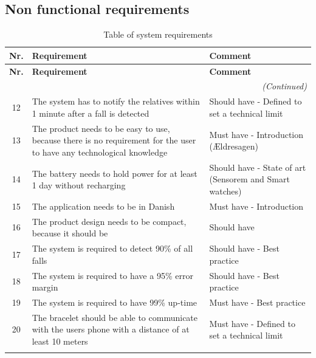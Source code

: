 \subsection{Non functional requirements}

\renewcommand{\arraystretch}{1.3}

\begin{longtable}{|c|p{8cm}|p{4cm}|}
\hline
\textbf{Nr.} & \textbf{Requirement} & \textbf{Comment} \\
\hline
\endfirsthead

\hline
\textbf{Nr.} & \textbf{Requirement} & \textbf{Comment} \\
\hline
\endhead

\hline
\multicolumn{3}{r}{\textit{(Continued)}} \\
\hline
\endfoot

\hline
\endlastfoot


12 & The system has to notify the relatives within 1 minute after a fall is detected & Should have - Defined to set a technical limit  \\
\hline
13 & The product needs to be easy to use, because there is no requirement for the user to have any technological knowledge & Must have - Introduction (Ældresagen) \\
\hline
14 & The battery needs to hold power for at least 1 day without recharging & Should have - State of art (Sensorem and Smart watches) \\
\hline
15 & The application needs to be in Danish & Must have - Introduction \\
\hline
16 & The product design needs to be compact, because it should be & Should have \\
\hline
17 & The system is required to detect 90\% of all falls & Should have - Best practice \\
\hline
18 & The system is required to have a 95\% error margin & Should have - Best practice \\
\hline
19 & The system is required to have 99\% up-time & Must have -  Best practice\\
\hline
20 & The bracelet should be able to communicate with the users phone with a distance of at least 10 meters & Must have - Defined to set a technical limit\\
\hline
\caption{Table of system requirements}
\label{tab:funktionelle_krav_tabel}
\end{longtable}